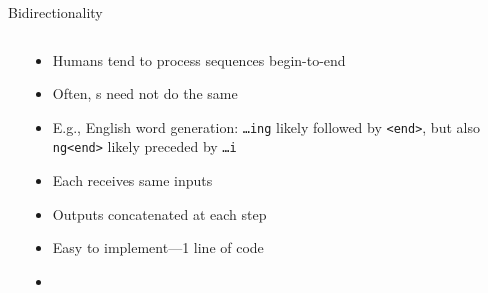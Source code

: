 \begin{frame}{Bidirectionality}
    \begin{columns}
        \begin{column}{0.53\textwidth}
            
        \end{column}
        \begin{column}{0.47\textwidth}
            \begin{itemize}[<.->]
                \item<+-> Humans tend to process sequences begin-to-end
                \item Often, \rnn{}s need not do the same
                \item E.g., English word generation: \texttt{\ldots{}ing} likely followed by \texttt{<end>}, but also \texttt{ng<end>} likely preceded by \texttt{\ldots{}i}
            \end{itemize}
            \begin{itemize}[<.->]
                \item Each receives same inputs
                \item Outputs concatenated at each step
                \item Easy to implement---1 line of code
                \item \citet{SchusterIEEESP97}
            \end{itemize}
        \end{column}
    \end{columns}
\end{frame}

